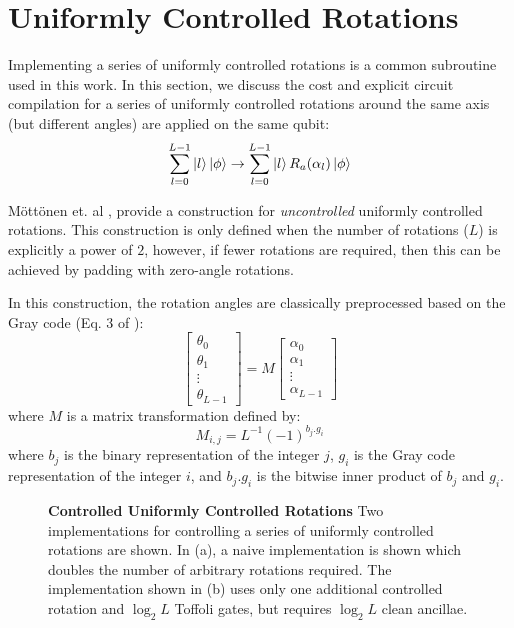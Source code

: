 \section{Uniformly Controlled Rotations}
\label{sec:multiplexed-rotations}

Implementing a series of uniformly controlled rotations is a common subroutine used in this work.
In this section, we discuss the cost and explicit circuit compilation for a series of uniformly controlled rotations around the same axis (but different angles) are applied on the same qubit:
\begin{equation}
    \sum_{l=0}^{L - 1} \ket{l} \ket{\phi} \rightarrow \sum_{l=0}^{L - 1} \ket{l} R_a (\alpha_l) \ket{\phi}
\end{equation}

Möttönen et. al \cite{mottonen2004transformation}, provide a construction for \textit{uncontrolled} uniformly controlled rotations.
This construction is only defined when the number of rotations ($L$) is explicitly a power of $2$, however, if fewer rotations are required, then this can be achieved by padding with zero-angle rotations.

In this construction, the rotation angles are classically preprocessed based on the Gray code (Eq. 3 of \cite{mottonen2004transformation}):
\begin{equation}
    \begin{bmatrix}
        \theta_{0} \\
        \theta_{1} \\
        \vdots \\
        \theta_{L - 1}
    \end{bmatrix} = M \begin{bmatrix}
        \alpha_{0} \\
        \alpha_{1} \\
        \vdots \\
        \alpha_{L - 1}
    \end{bmatrix}
\end{equation}
where $M$ is a matrix transformation defined by:
\begin{equation}
    M_{i, j} = L^{-1} (-1)^{b_{j} . g_{i}}
\end{equation}
where $b_j$ is the binary representation of the integer $j$, $g_i$ is the Gray code representation of the integer $i$, and $b_{j} . g_{i}$ is the bitwise inner product of $b_{j}$ and $g_{i}$.

\begin{figure*}
    
    
    \caption{
        \textbf{Controlled Uniformly Controlled Rotations}
        Two implementations for controlling a series of uniformly controlled rotations are shown.
        In (a), a naive implementation is shown which doubles the number of arbitrary rotations required.
        The implementation shown in (b) uses only one additional controlled rotation and $\log_2 L$ Toffoli gates, but requires $\log_2 L$ clean ancillae.
    }
    \label{fig:controlled-multiplexed-rotations}
\end{figure*}

